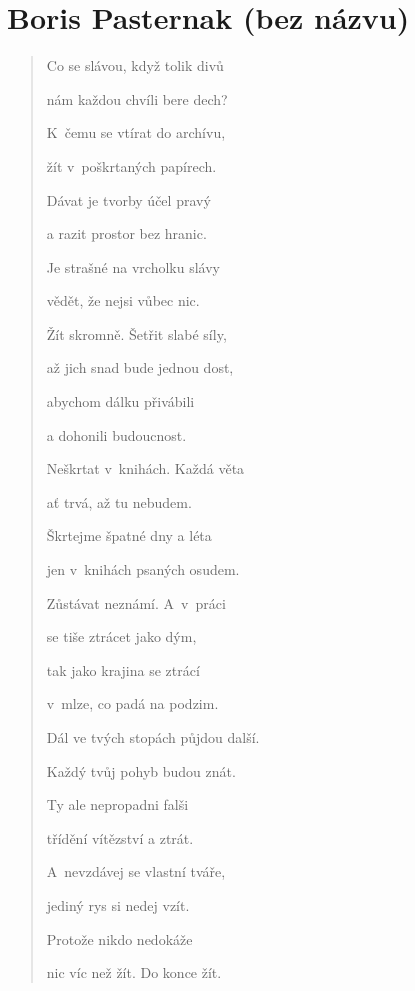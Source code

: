 \section{Boris Pasternak (bez názvu)}

\begin{verse}


Co se slávou, když tolik divů

nám každou chvíli bere dech?

K~čemu se vtírat do archívu,

žít v~poškrtaných papírech.

\medskip

Dávat je tvorby účel pravý

a razit prostor bez hranic.

Je strašné na vrcholku slávy

vědět, že nejsi vůbec nic.

\medskip

Žít skromně. Šetřit slabé síly,

až jich snad bude jednou dost,

abychom dálku přivábili

a dohonili budoucnost.

\medskip

Neškrtat v~knihách. Každá věta

ať trvá, až tu nebudem.

Škrtejme špatné dny a léta

jen v~knihách psaných osudem.

\medskip

Zůstávat neznámí. A~v~práci

se tiše ztrácet jako dým,

tak jako krajina se ztrácí

v~mlze, co padá na podzim.

\medskip

Dál ve tvých stopách půjdou další.

Každý tvůj pohyb budou znát.

Ty ale nepropadni falši

třídění vítězství a ztrát.

\medskip

A~nevzdávej se vlastní tváře,

jediný rys si nedej vzít.

Protože nikdo nedokáže

nic víc než žít. Do konce žít.

\end{verse}

